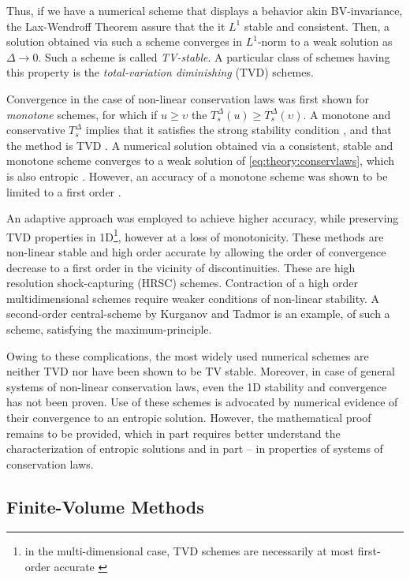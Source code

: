 \documentclass[11pt,a4paper,headinclude=true,DIV=14,BCOR=8mm,chapterprefix,listof=totoc,twoside,openright,abstracton]{scrbook}
\begin{document}
Thus, if we have a numerical scheme that displays a behavior akin BV-invariance, the Lax-Wendroff Theorem assure that the it $L^1$ stable and consistent. Then, a solution obtained via such a scheme converges in $L^1$-norm to a weak solution as $\Delta\rightarrow 0$. Such a scheme is called \textit{TV-stable}. A particular class of schemes having this property is the \textit{total-variation diminishing} (TVD) schemes. 

Convergence in the case of non-linear conservation laws was first shown for \textit{monotone} schemes, for which if $u \geq \upsilon$ the $T_{s}^{\Delta}(u) \geq T_{s}^{\Delta}(\upsilon)$. A monotone and conservative $T_{s}^{\Delta}$ implies that it satisfies the strong stability condition \cite{Crandall:1980proc}, and that the method is TVD \cite{LeVeque:1992}. A numerical solution obtained via a consistent, stable and monotone scheme converges to a weak solution of \ref{eq:theory:conservlaws}, which is also entropic \cite{Crandall:1980}. However, an accuracy of a monotone scheme was shown to be limited to a first order \cite{Harten:1976}. 

An adaptive approach was employed to achieve higher accuracy, while preserving TVD properties in 1D\footnote{in the multi-dimensional case, TVD schemes are necessarily at most first-order accurate \cite{Goodman:1985}}, however at a loss of monotonicity. These methods are non-linear stable and high order accurate by allowing the order of convergence decrease to a first order in the vicinity of discontinuities. These are high resolution shock-capturing (HRSC) schemes. Contraction of a high order multidimensional schemes require weaker conditions of non-linear stability. A second-order central-scheme by Kurganov and Tadmor \cite{Kurganov:2000} is an example, of such a scheme, satisfying the maximum-principle. 

Owing to these complications, the most widely used numerical schemes are neither TVD nor have been shown to be TV stable. Moreover, in case of general systems of non-linear conservation laws, even the 1D stability and convergence has not been proven. Use of these schemes is advocated by numerical evidence of their convergence to an entropic solution. However, the mathematical proof remains to be provided, which in part requires better understand the characterization of entropic solutions \cite{Tadmor1998} and in part -- in properties of systems of conservation laws.  


\subsection{Finite-Volume Methods}
\end{document}
